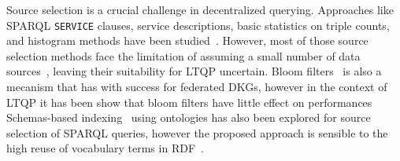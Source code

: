 Source selection is a crucial challenge in decentralized querying.
Approaches like SPARQL \texttt{SERVICE} clauses, service descriptions, basic statistics on triple counts, and histogram methods have been studied~\cite{hose2012towards, Harth2010}.
However, most of those source selection methods face the limitation of assuming a small number of data sources~\cite{Harth2010}, leaving their suitability for LTQP uncertain.
Bloom filters~\cite{dia2018fast} is also a mecanism that has with success for federated DKGs, however in the context of LTQP it has been show that bloom filters have little effect on performances~\cite{Hanski2024}
Schemas-based indexing~\cite{Stuckenschmidt2004} using ontologies has also been explored for source selection of SPARQL queries,
however the proposed approach is sensible to the high reuse of vocabulary terms in RDF~\cite{Harth2010}.
